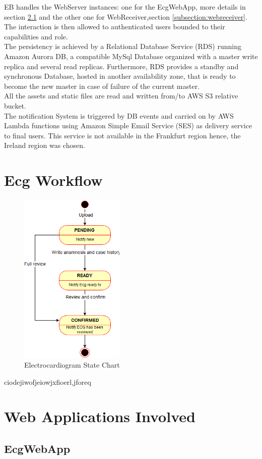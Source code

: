 EB handles the WebServer instances: one for the EcgWebApp, more details in section \ref{subsection:ecgwebapp} and the other one for WebReceiver,section \ref{subsection:webreceiver}. The interaction is then allowed to authenticated users bounded to their capabilities and role.\\
The persistency is achieved by a Relational Database Service (RDS) running Amazon Aurora DB, a compatible MySql Database organized with a master write replica and several read replicas.
Furthermore, RDS provides a standby and synchronous Database, hosted in another availability zone, that is ready to become the new master in case of failure of the current master.\\
All the assets and static files are read and written from/to AWS S3 relative bucket.\\
The notification System is triggered by DB events and carried on by AWS Lambda functions using Amazon Simple Email Service (SES) as delivery service to final users. This service is not available in the Frankfurt region hence, the Ireland region was chosen.


\section{Ecg Workflow}
\begin{figure}[h]
    \includegraphics[width=5cm]{ECGstatechart}
    \caption{Electrocardiogram State Chart}
    \label{fig:ECGstatechart}
\end{figure}
ciodejiwofjeiowjxfioerl,jforeq
\section{Web Applications Involved}
\subsection{EcgWebApp}
\label{subsection:ecgwebapp}
